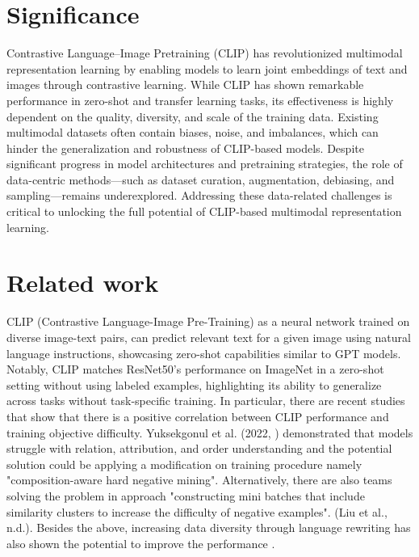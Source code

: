 \documentclass[11pt,letterpaper]{article}
\begin{document}
\section{Significance}
Contrastive Language–Image Pretraining (CLIP) has revolutionized multimodal representation learning by enabling models to learn joint embeddings of text and images through contrastive learning. While CLIP has shown remarkable performance in zero-shot and transfer learning tasks, its effectiveness is highly dependent on the quality, diversity, and scale of the training data. Existing multimodal datasets often contain biases, noise, and imbalances, which can hinder the generalization and robustness of CLIP-based models. Despite significant progress in model architectures and pretraining strategies, the role of data-centric methods—such as dataset curation, augmentation, debiasing, and sampling—remains underexplored. Addressing these data-related challenges is critical to unlocking the full potential of CLIP-based multimodal representation learning.



\section{Related work} 
CLIP (Contrastive Language-Image Pre-Training) as a neural network trained on diverse image-text pairs, can predict relevant text for a given image using natural language instructions, showcasing zero-shot capabilities similar to GPT models. 
Notably, CLIP matches ResNet50's performance on ImageNet in a zero-shot setting without using labeled examples, highlighting its ability to generalize across tasks without task-specific training. 
In particular, there are recent studies that show that there is a positive correlation between CLIP performance and training objective difficulty. 
Yuksekgonul et al. (2022, \cite{yuksekgonul2023visionlanguagemodelsbehavelike}) demonstrated that models struggle with relation, attribution, and order understanding and the potential solution could be applying a modification on training procedure namely "composition-aware hard negative mining". 
Alternatively, there are also teams solving the problem in approach "constructing mini batches that include similarity clusters to increase the difficulty of negative examples". (Liu et al., n.d.). 
Besides the above, increasing data diversity through language rewriting has also shown the potential to improve the performance \cite{fan2023improvingcliptraininglanguage}.
\end{document}
